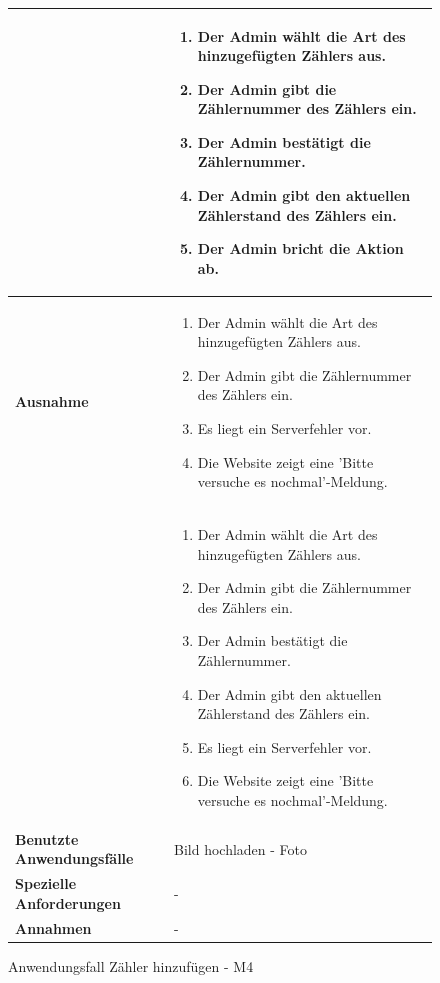 \begin{figure}[h]
	\centering
	\begin{tabularx}{\textwidth}{ X | X }
	&
		\begin{enumerate}
			\item Der Admin wählt die Art des hinzugefügten Zählers aus.
			\item Der Admin gibt die Zählernummer des Zählers ein.
			\item Der Admin bestätigt die Zählernummer.
			\item Der Admin gibt den aktuellen Zählerstand des Zählers ein.
			\item Der Admin bricht die Aktion ab.
		\end{enumerate} \\ \hline
		\textbf{Ausnahme} & 
		\begin{enumerate}
			\item Der Admin wählt die Art des hinzugefügten Zählers aus.
			\item Der Admin gibt die Zählernummer des Zählers ein.
			\item Es liegt ein Serverfehler vor.
			\item Die Website zeigt eine 'Bitte versuche es nochmal'-Meldung.
		\end{enumerate} \\ &
		\begin{enumerate}
			\item Der Admin wählt die Art des hinzugefügten Zählers aus.
			\item Der Admin gibt die Zählernummer des Zählers ein.
			\item Der Admin bestätigt die Zählernummer.
			\item Der Admin gibt den aktuellen Zählerstand des Zählers ein.
			\item Es liegt ein Serverfehler vor.
			\item Die Website zeigt eine 'Bitte versuche es nochmal'-Meldung.
		\end{enumerate} \\ \hline
		\textbf{Benutzte Anwendungsfälle} & Bild hochladen - Foto \\ \hline
		\textbf{Spezielle Anforderungen} & - \\ \hline
		\textbf{Annahmen} & -
	\end{tabularx}
	\caption{Anwendungsfall Zähler hinzufügen - M4}
	\label{fig:anwendungsfall-server-tabelle-xx-1}
\end{figure}
\newpage

